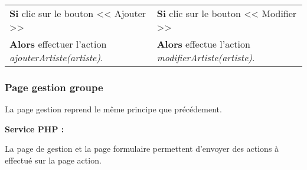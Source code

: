         \newpage
            
            \begin{center}
                \begin{tabular}{l | l}
                    \textbf{Si} clic sur le bouton << Ajouter >> & \textbf{Si} clic sur le bouton << Modifier >> \\
                    \textbf{Alors} effectuer l'action \emph{ajouterArtiste(artiste)}. & \textbf{Alors} effectue l'action \emph{modifierArtiste(artiste)}.
                \end{tabular}
            \end{center}
            
			

    \clearpage

		\subsubsection{Page gestion groupe}

			\begin{paragraphe}
                La page gestion reprend le même principe que précédement. 
			\end{paragraphe}

			\begin{paragraphe}
				\textbf{Service PHP :}
			\end{paragraphe}
            
            \begin{paragraphe}
                La page de gestion et la page formulaire permettent d'envoyer des actions à effectué sur la page action. \\
			\end{paragraphe}

